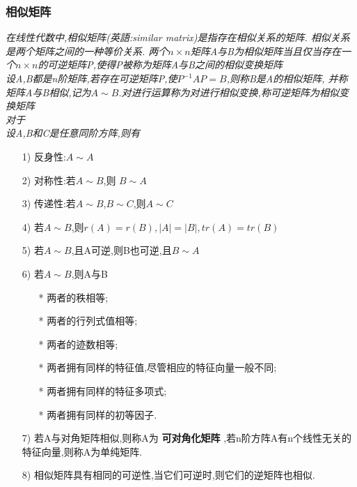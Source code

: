 \documentclass{scrartcl}
\numberwithin{equation}{section}
\begin{document}
\subsubsection{相似矩阵}
\textsl{在线性代数中,相似矩阵(英語:similar matrix)是指存在相似关系的矩阵. 相似关系是两个矩阵之间的一种等价关系. 两个$n×n$矩阵A与B为相似矩阵当且仅当存在一个$n×n$的可逆矩阵P,使得P被称为矩阵A与B之间的相似变换矩阵\\设A,B都是n阶矩阵,若存在可逆矩阵P,使$P^{-1}AP=B$,则称B是A的相似矩阵, 并称矩阵A与B相似,记为$A \sim B$.对进行运算称为对进行相似变换,称可逆矩阵为相似变换矩阵\\
    对于\\
    设A,B和C是任意同阶方阵,则有}
\begin{itemize}
    \item [1)] 反身性:$A \sim  A$
    \item [2)] 对称性:若$A \sim B$,则 $B \sim A$
    \item [3)] 传递性:若$A \sim B$,$B \sim C$,则$A \sim C$
    \item [4)] 若$A \sim B$,则$r(A)=r(B),|A|=|B|,tr(A)=tr(B)$
    \item [5)] 若$A \sim B$,且A可逆,则B也可逆,且$B \sim A$
    \item [6)] 若$A \sim B$,则A与B
          \begin{itemize}
              \item [*] 两者的秩相等;
              \item [*] 两者的行列式值相等;
              \item [*] 两者的迹数相等;
              \item [*] 两者拥有同样的特征值,尽管相应的特征向量一般不同;
              \item [*] 两者拥有同样的特征多项式;
              \item [*] 两者拥有同样的初等因子.
          \end{itemize}
    \item [7)] 若A与对角矩阵相似,则称A为 \textbf{可对角化矩阵} ,若n阶方阵A有n个线性无关的特征向量,则称A为单纯矩阵.
    \item [8)]相似矩阵具有相同的可逆性,当它们可逆时,则它们的逆矩阵也相似.
\end{itemize}
\end{document}
